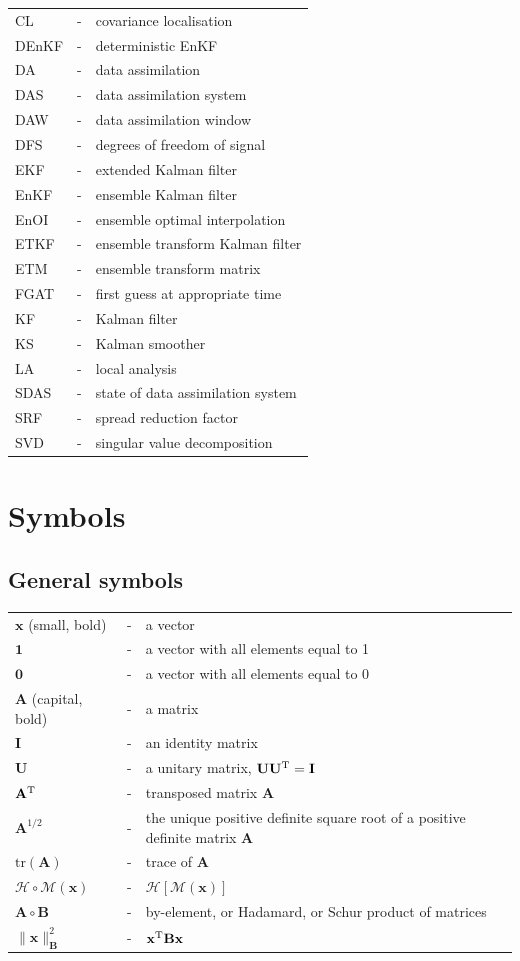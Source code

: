 \documentclass[11pt]{report}
\newcommand{\mb} {\mathbf}
\newcommand{\T}{^{\tiny \mathrm T}}
\begin{document}
\begin{tabular}{lll}
  CL &-& covariance localisation \\
  DEnKF &-& deterministic EnKF \\
  DA &-& data assimilation \\
  DAS &-& data assimilation system \\
  DAW &-& data assimilation window \\
  DFS &-& degrees of freedom of signal \\
  EKF &-& extended Kalman filter \\
  EnKF &-& ensemble Kalman filter \\
  EnOI &-& ensemble optimal interpolation \\
  ETKF &-& ensemble transform Kalman filter \\
  ETM &-& ensemble transform matrix \\
  FGAT &-& first guess at appropriate time \\
  KF &-& Kalman filter \\
  KS &-& Kalman smoother \\
  LA &-& local analysis \\
  SDAS &-& state of data assimilation system \\
  SRF &-& spread reduction factor \\
  SVD &-& singular value decomposition \\
\end{tabular}

\clearpage

\chapter*{Symbols}

\section*{General symbols}
\begin{tabular}{lll}
  $\mb x$ (small, bold) &-& a vector \\
  $\mb 1$ &-& a vector with all elements equal to 1 \\
  $\mb 0$ &-& a vector with all elements equal to 0 \\
  $\mb A$ (capital, bold) &-& a matrix \\
  $\mb I$ &-& an identity matrix \\
  $\mb U$ &-& a unitary matrix, $\mb U \mb U\T = \mb I$ \\
  $\mb A\T$ &-& transposed matrix $\mb A$ \\
  $\mb A^{1/2}$ &-& the unique positive definite square root of a positive definite matrix $\mb A$ \\
  $\mathrm{tr}(\mb A)$ &-& trace of $\mb A$ \\
  $\mathcal H \circ \mathcal M(\mb x)$ &-& $\mathcal H \left[ \mathcal M (\mb x) \right]$ \\
  $\mb A \circ \mb B$ &-& by-element, or Hadamard, or Schur product of matrices\\
  $\|\mb x\|^2_{\mb B }$ &-& $ \mb x\T \mb B \mb x$
  \end{tabular}
\end{document}

